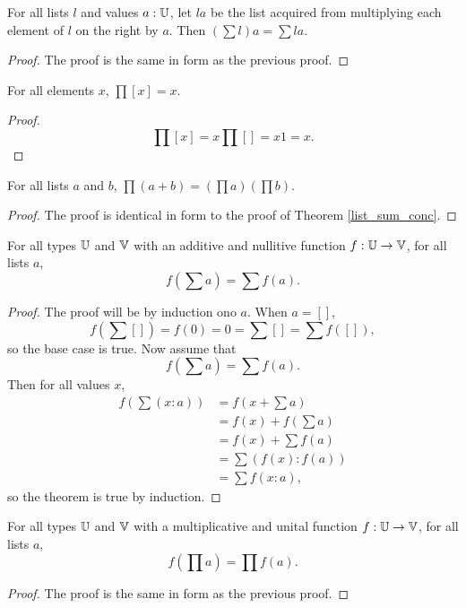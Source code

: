 \documentclass[../../math.tex]{subfiles}
\begin{document}
\begin{theorem} \label{list_sum_rmult}
    For all lists $l$ and values $a : \mathbb{U}$, let $la$ be the list acquired from
    multiplying each element of $l$ on the right by $a$.  Then $\left( \sum l
    \right) a = \sum la$.
\end{theorem}
\begin{proof}
    The proof is the same in form as the previous proof.
\end{proof}

\begin{theorem}
    For all elements $x$, $\prod [x] = x$.
\end{theorem}
\begin{proof}
    \[
        \prod [x] = x \prod [] = x 1 = x.
    \]
\end{proof}

\begin{theorem} \label{list_prod_conc}
    For all lists $a$ and $b$, $\prod (a + b) = (\prod a) (\prod b)$.
\end{theorem}
\begin{proof}
    The proof is identical in form to the proof of Theorem \ref{list_sum_conc}.
\end{proof}

\begin{theorem} \label{list_sum_homo}
    For all types $\mathbb{U}$ and $\mathbb{V}$ with an additive and nullitive function $f : \mathbb{U}
    \to \mathbb{V}$, for all lists $a$,
    \[
        f\left( \sum a \right) = \sum f(a).
    \]
\end{theorem}
\begin{proof}
    The proof will be by induction ono $a$.  When $a = []$,
    \[
        f \left( \sum [] \right) = f(0) = 0 = \sum [] = \sum f([]),
    \]
    so the base case is true.  Now assume that
    \[
        f\left( \sum a \right) = \sum f(a).
    \]
    Then for all values $x$,
    \begin{align*}
        f\left( \sum (x : a) \right)
        &= f\left( x + \sum a \right) \\
        &= f(x) + f\left( \sum a \right) \\
        &= f(x) + \sum f(a) \\
        &= \sum (f(x) : f(a)) \\
        &= \sum f(x : a),
    \end{align*}
    so the theorem is true by induction.
\end{proof}

\begin{theorem} \label{list_prod_homo}
    For all types $\mathbb{U}$ and $\mathbb{V}$ with a multiplicative and unital function $f :
    \mathbb{U} \to \mathbb{V}$, for all lists $a$,
    \[
        f\left( \prod a \right) = \prod f(a).
    \]
\end{theorem}
\begin{proof}
    The proof is the same in form as the previous proof.
\end{proof}
\end{document}
